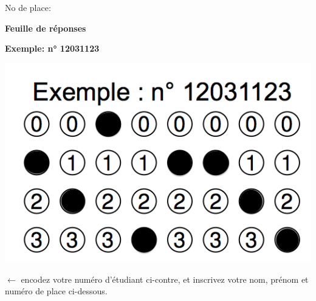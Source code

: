\documentclass[a4paper]{article}
\begin{document}
{{{\begin{minipage}{.9\linewidth}
      \vspace*{.5cm}\dotfill

      No de place:      

      \vspace*{.5cm}\dotfill

      \vspace*{1mm}
    \end{minipage}
  }
}\hspace*{\fill}
\vspace{1ex}





\AMCcleardoublepage    

\AMCdebutFormulaire    

{\large\bf\noindent Feuille de réponses}

{\setlength{\parindent}{0pt}\hspace*{\fill}

{\bf Exemple: n° 12031123}

\includegraphics[trim = 30px 0 0 77px, clip,scale=0.25]{src/graphics/expleNoEtudiant.png}\hspace*{\fill}

\hspace*{\fill}
\begin{minipage}[b]{6.5cm}\setlength{\parindent}{0pt}
$\longleftarrow{}$\hspace{0pt plus 1cm} encodez votre numéro d'étu\-diant ci-contre,
et inscrivez votre nom, prénom et numéro de place ci-dessous.

\vspace{3ex}


\end{minipage}}}
\end{document}
